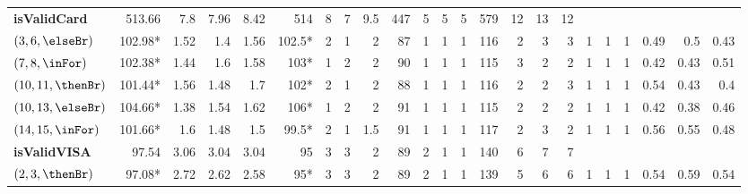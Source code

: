 \begin{tabular}{l|rrrr|rrrr|rrrr|rrrr|rrrrrr}
    \midrule
    \midrule
    \textbf{isValidCard}       & 513.66 & 7.8 & 7.96 & 8.42 & 514   & 8 &  7 & 9.5 & 447 & 5 & 5 & 5 & 579 & 12 & 13 & 12  & & & & & & \\
    $(3,6,\elseBr)$   & 102.98* & 1.52 & 1.4     & 1.56  &  102.5* & 2  &  1  & 2    &  87  &  1  &  1  &  1  &  116 &  2   &  3   &  3    &  1 &  1 &  1 & 0.49    & 0.5  & 0.43 \\
    $(7,8,\inFor)$    & 102.38* & 1.44 & 1.6  & 1.58  & 103*   & 1  & 2  & 2    & 90  & 1  & 1  & 1  & 115 & 3   & 2   & 2    & 1 & 1 & 1 & 0.42 & 0.43 & 0.51 \\
    $(10,11,\thenBr)$ & 101.44* & 1.56    & 1.48 & 1.7   & 102*   & 2  & 1  & 2    & 88  & 1  & 1  & 1  & 116 & 2   & 2   & 3    &  1 &  1 &  1 &  0.54 & 0.43 &  0.4 \\
    $(10,13,\elseBr)$ & 104.66* & 1.38 & 1.54 & 1.62  & 106*   & 1  & 2  & 2    & 91  & 1  & 1  & 1  & 115 & 2   & 2   & 2    & 1 & 1 &  1 &  0.42 & 0.38 &  0.46 \\
    $(14,15,\inFor)$  & 101.66* & 1.6  & 1.48 & 1.5   & 99.5*  & 2  & 1  & 1.5  & 91  & 1  & 1  & 1  & 117 & 2   & 3   & 2    & 1 & 1 &  1 &  0.56 &  0.55 & 0.48 \\
    \midrule
    \midrule
    \textbf{isValidVISA}       & 97.54 & 3.06 & 3.04 & 3.04 & 95 & 3 & 3 & 2 &  89 & 2  & 1 & 1 & 140 & 6 & 7 & 7 & & & & & & \\
    $(2,3,\thenBr)$   & 97.08* & 2.72 &  2.62 & 2.58 & 95* & 3 & 3 & 2 &  89 &  2 &  1 &  1 &  139 &  5 &  6 &  6 &  1 &  1 &  1 &  0.54 &  0.59 &  0.54 \\

\end{tabular}
